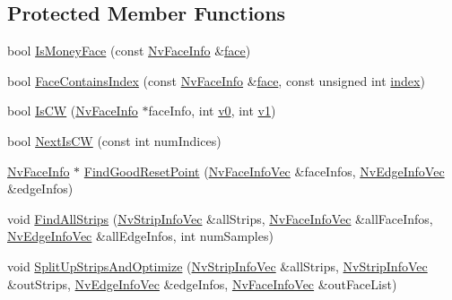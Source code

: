 \subsection*{Protected Member Functions}
\begin{CompactItemize}
\item 
bool \hyperlink{class_nv_stripifier_e7399bc8bac9ee4cfbf17623f9c6c2b7}{IsMoneyFace} (const \hyperlink{class_nv_face_info}{NvFaceInfo} \&\hyperlink{glext_8h_676ca580c460c0154eb58200433d2a9e}{face})
\item 
bool \hyperlink{class_nv_stripifier_018218c73625b108fa07e5608b8982bf}{FaceContainsIndex} (const \hyperlink{class_nv_face_info}{NvFaceInfo} \&\hyperlink{glext_8h_676ca580c460c0154eb58200433d2a9e}{face}, const unsigned int \hyperlink{glext__bak_8h_57f14e05b1900f16a2da82ade47d0c6d}{index})
\item 
bool \hyperlink{class_nv_stripifier_9f4e13a6706b11e6634accb73ad43ba6}{IsCW} (\hyperlink{class_nv_face_info}{NvFaceInfo} $\ast$faceInfo, int \hyperlink{glext__bak_8h_8f5597b6002609ead33af221dcf29790}{v0}, int \hyperlink{glext__bak_8h_435c176a02c061b43e19bdf7c86cceae}{v1})
\item 
bool \hyperlink{class_nv_stripifier_a3bf53ccf3e03e6b4cfd0746f708bd60}{NextIsCW} (const int numIndices)
\item 
\hyperlink{class_nv_face_info}{NvFaceInfo} $\ast$ \hyperlink{class_nv_stripifier_1719480e83ed6a6f76b690d851dbf29f}{FindGoodResetPoint} (\hyperlink{_nv_tri_strip_objects_8h_93d0a2f26991e801145908bc4d3d9156}{NvFaceInfoVec} \&faceInfos, \hyperlink{_nv_tri_strip_objects_8h_58592f6a13118931e843d05574249663}{NvEdgeInfoVec} \&edgeInfos)
\item 
void \hyperlink{class_nv_stripifier_d847ecb4dfa70fe5432470e0fc569472}{FindAllStrips} (\hyperlink{_nv_tri_strip_objects_8h_83f9ba7bd0288dc93c5eed20e7f61170}{NvStripInfoVec} \&allStrips, \hyperlink{_nv_tri_strip_objects_8h_93d0a2f26991e801145908bc4d3d9156}{NvFaceInfoVec} \&allFaceInfos, \hyperlink{_nv_tri_strip_objects_8h_58592f6a13118931e843d05574249663}{NvEdgeInfoVec} \&allEdgeInfos, int numSamples)
\item 
void \hyperlink{class_nv_stripifier_def493456c6deefa0f0ae8faf37a17e1}{SplitUpStripsAndOptimize} (\hyperlink{_nv_tri_strip_objects_8h_83f9ba7bd0288dc93c5eed20e7f61170}{NvStripInfoVec} \&allStrips, \hyperlink{_nv_tri_strip_objects_8h_83f9ba7bd0288dc93c5eed20e7f61170}{NvStripInfoVec} \&outStrips, \hyperlink{_nv_tri_strip_objects_8h_58592f6a13118931e843d05574249663}{NvEdgeInfoVec} \&edgeInfos, \hyperlink{_nv_tri_strip_objects_8h_93d0a2f26991e801145908bc4d3d9156}{NvFaceInfoVec} \&outFaceList)

\end{CompactItemize}

